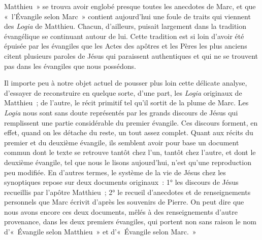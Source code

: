 \documentclass[french,twoside]{book} %
\begin{document}
Matthieu » se trouva avoir englobé presque toutes les anecdotes de Marc, et que « l’Évangile selon Marc » contient aujourd’hui une foule de traits qui viennent des {\itshape Logia} de Matthieu. Chacun, d’ailleurs, puisait largement dans la tradition évangélique se continuant autour de lui. Cette tradition est si loin d’avoir été épuisée par les évangiles que les Actes des apôtres et les Pères les plus anciens citent plusieurs paroles de Jésus qui paraissent authentiques et qui ne se trouvent pas dans les évangiles que nous possédons.\par
Il importe peu à notre objet actuel de pousser plus loin cette délicate analyse, d’essayer de reconstruire en quelque sorte, d’une part, les {\itshape Logia} originaux de Matthieu ; de l’autre, le récit primitif tel qu’il sortit de la plume de Marc. Les {\itshape Logia} nous sont sans doute représentés par les grands discours de Jésus qui remplissent une partie considérable du premier évangile. Ces discours forment, en effet, quand on les détache du reste, un tout assez complet. Quant aux récits du premier et du deuxième évangile, ils semblent avoir pour base un document commun dont le texte se retrouve tantôt chez l’un, tantôt chez l’autre, et dont le deuxième évangile, tel que nous le lisons aujourd’hui, n’est qu’une reproduction peu modifiée. En d’autres termes, le système de la vie de Jésus chez les synoptiques repose sur deux documents originaux : 1° les discours de Jésus recueillis par l’apôtre Matthieu ; 2° le recueil d’anecdotes et de renseignements personnels que Marc écrivit d’après les souvenirs de Pierre. On peut dire que nous avons encore ces deux documents, mêlés à des renseignements d’autre provenance, dans les deux premiers évangiles, qui portent non sans raison le nom d’« Évangile selon Matthieu » et d’« Évangile selon Marc. »\par
\end{document}
